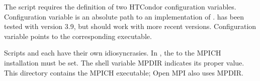
The  script requires the definition of
two HTCondor configuration variables.
Configuration variable  is an absolute path to
an implementation of .
 has been tested with  version 3.9,
but should work with more recent versions.
Configuration variable  points
to the corresponding  executable.

Scripts  and 
each have their own idiosyncrasies.
In , the  to the MPICH installation must be set.
The shell variable MPDIR indicates its proper value.
This directory contains the MPICH  executable; Open MPI also
uses MPDIR.


